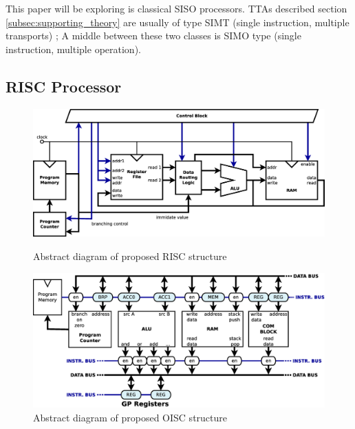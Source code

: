 This paper will be exploring is classical SISO processors. TTAs described section \ref{subsec:supporting_theory} are usually of type SIMT (single instruction, multiple transports) \autocite{289981}; A middle between these two classes is SIMO type (single instruction, multiple operation).

\subsection{RISC Processor}

\begin{figure}[t!]
	\centering
	\includegraphics[width=\linewidth]{../resources/risc.eps}
	\caption{Abstract diagram of proposed RISC structure}
	\label{fig:risc_simple}
	
	\vspace{1cm}
	
	\includegraphics[width=\linewidth]{../resources/oisc.eps}
	\caption{Abstract diagram of proposed OISC structure}
	\label{fig:oisc_simple}
\end{figure}

